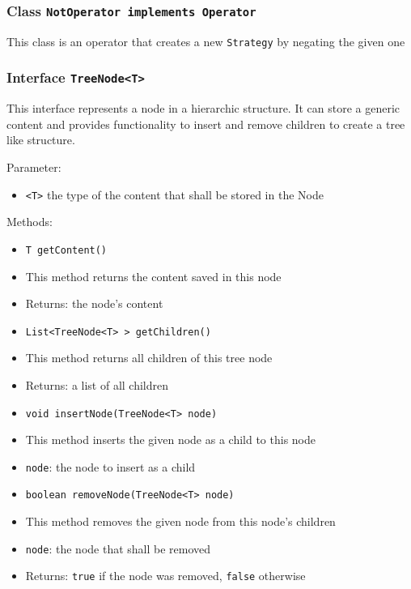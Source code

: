 \documentclass[parskip=full,11pt]{scrartcl}
\begin{document}
\subsubsection{Class \texttt{NotOperator implements Operator}}

This class is an operator that creates a new \texttt{Strategy} by negating the given one 

\subsubsection{Interface \texttt{TreeNode<T>}}

This interface represents a node in a hierarchic structure. It can store a generic content and provides functionality to insert and remove children to create a tree like structure.

Parameter:
\begin{itemize}\itemsep -10pt
	\item \texttt{<T>} the type of the content that shall be stored in the Node
\end{itemize}

Methods:
\begin{itemize}\itemsep -10pt
	\item \texttt{T getContent()}
	\item[] This method returns the content saved in this node
	\item[] Returns: the node's content
	
	\item \texttt{List<TreeNode<T>\,> getChildren()}
	\item[] This method returns all children of this tree node
	\item[] Returns: a list of all children
	
	\item \texttt{void insertNode(TreeNode<T> node)}
	\item[] This method inserts the given node as a child to this node
	\item[] \texttt{node}: the node to insert as a child 
	
	\item \texttt{boolean removeNode(TreeNode<T> node)}
	\item[] This method removes the given node from this node's children
	\item[] \texttt{node}: the node that shall be removed
	\item[] Returns: \texttt{true} if the node was removed, \texttt{false} otherwise
\end{itemize}
\end{document}
